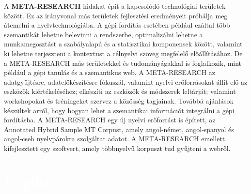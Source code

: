 \begin{multicols}{2}
  A \textbf{META-RESEARCH} hidakat épít a kapcsolódó technológiai területek között. Ez az irányvonal más területek fejlesztési eredményeit próbálja meg átemelni a nyelvtechnológiába. A gépi fordítás ese\-té\-ben például ezáltal több szemantikát lehetne belevinni a rendszerbe, op\-ti\-ma\-li\-zál\-ni lehetne a munkamegosztást a sza\-bály\-ala\-pú és a statisztikai komponensek között, valamint ki lehetne terjeszteni a kontextust a célnyelvi szöveg megfelelő előállításához. De a META-RESEARCH más területekkel és tudományágakkal is foglalkozik, mint például a gépi ta\-nu\-lás és a szemantikus web. A META-RESEARCH az adatgyűjtésre, adat\-elő\-ké\-szí\-tés\-re fókuszál, valamint nyelvi erőforrásokat állít elő az eszközök kiértékeléséhez; elkészíti az eszközök és módszerek leltárját; valamint workshopokat és tréningeket szervez a közösség tagjainak. Továbbá ajánlások készültek arról, hogy hogyan lehet a szemantikai információt integrálni a gépi fordításba. A META-RESEARCH egy új nyelvi erőforrást is épített, az Annotated Hybrid Sample MT Corpust, amely angol-német, angol-spanyol és angol-cseh nyelvpárokra szolgáltat adatot. A META-RESEARCH emellett kifejlesztett egy szoftvert, amely többnyelvű korpuszt tud gyűjteni a webről. 
  \end{multicols}



  \makeatletter
  {
    \renewcommand*{\theHsection}{\thepart.\thesection}
  }
  \makeatother
  \part*{\textcolor{white}{English}}

  \setcounter{section}{0}
  \setcounter{figure}{0}

  \cleardoublepage




